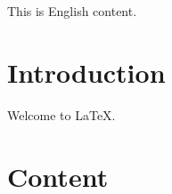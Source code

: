 \documentclass{article}
\newif\ifchinese
\begin{document}
\ifchinese
  这是中文内容。
\else
  This is English content. 
\fi

\section{Introduction}

\ifchinese
  欢迎使用 LaTeX。
\else
  Welcome to LaTeX.
\fi

\section{Content}

\ifchinese
  这是一些中文内容。在中文模式下，您可以使用 ctex 宏包支持中文排版。
\else
  \lipsum[1-2]
\fi
\end{document}
